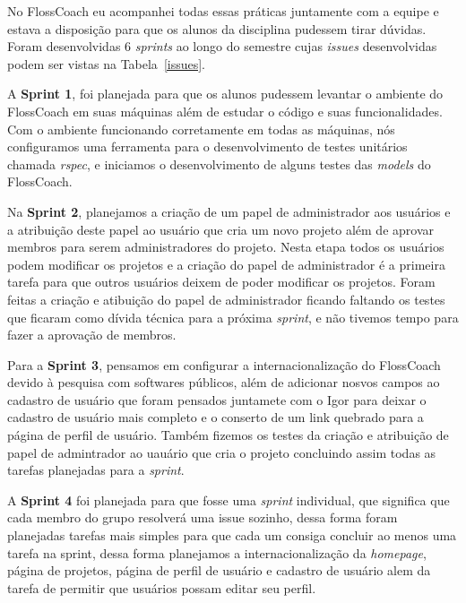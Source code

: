 No FlossCoach eu acompanhei todas essas práticas juntamente com a equipe e estava
a disposição para que os alunos da disciplina pudessem tirar dúvidas. Foram desenvolvidas
6 \textit{sprints} ao longo do semestre cujas \textit{issues} desenvolvidas podem
ser vistas na Tabela~\ref{issues}.

A \textbf{Sprint 1}, foi planejada para que os alunos pudessem levantar o ambiente
do FlossCoach em suas máquinas além de estudar o código e suas funcionalidades. Com o
ambiente funcionando corretamente em todas as máquinas, nós configuramos uma ferramenta
para o desenvolvimento de testes unitários chamada \textit{rspec}, e iniciamos o 
desenvolvimento de alguns testes das \textit{models} do FlossCoach. 

Na \textbf{Sprint 2}, planejamos a criação de um papel de administrador aos usuários
e a atribuição deste papel ao usuário que cria um novo projeto além de aprovar 
membros para serem administradores do projeto. Nesta etapa todos os usuários podem
modificar os projetos e a criação do papel de administrador é a primeira tarefa 
para que outros usuários deixem de poder modificar os projetos. Foram feitas a 
criação e atibuição do papel de administrador ficando faltando os testes que
ficaram como dívida técnica para a próxima \textit{sprint}, e não tivemos tempo para fazer a 
aprovação de membros. 

Para a \textbf{Sprint 3}, pensamos em configurar a internacionalização do FlossCoach
devido à pesquisa com softwares públicos, além de adicionar nosvos campos ao cadastro 
de usuário que foram pensados juntamete com o Igor para deixar o cadastro de usuário 
mais completo e o conserto de um link quebrado para a página de perfil de usuário.
Também fizemos os testes da criação e atribuição de papel de admintrador ao uauário
que cria o projeto concluindo assim todas as tarefas planejadas para a \textit{sprint}.

A \textbf{Sprint 4} foi planejada para que fosse uma \textit{sprint} individual, que
significa que cada membro do grupo resolverá uma issue sozinho, dessa forma foram 
planejadas tarefas mais simples para que cada um consiga concluir ao menos uma
tarefa na sprint, dessa forma planejamos a internacionalização da \textit{homepage},
página de projetos, página de perfil de usuário e cadastro de usuário alem da 
tarefa de permitir que usuários possam editar seu perfil.

